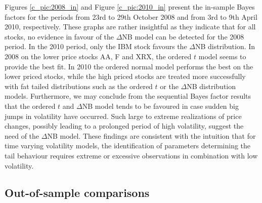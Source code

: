 \documentclass[12pt]{article}
\begin{document}
Figures \ref{c_pic:2008_in} and Figure \ref{c_pic:2010_in} present the in-sample
Bayes factors for the periods from 23rd to 29th October 2008 and from
3rd to 9th April 2010, respectively.
These graphs are rather insightful as they indicate that for all stocks, no evidence in
favour of the $\Delta$NB model can be detected for the 2008 period.
In the 2010 period, only the IBM stock favours the $\Delta$NB distribution.
In 2008 on the lower price stocks  AA, F and XRX,  the ordered $t$ model seems to
provide the best fit.
In 2010 the ordered normal model performs the best on the lower priced stocks,
while the high priced stocks are treated more successfully with fat tailed distributions
such as the ordered $t$ or the $\Delta$NB distribution models.
Furthermore, we may conclude from 
the sequential Bayes factor results that the ordered $t$ and $\Delta$NB model tends
to be favoured in case sudden big jumps in volatility have occurred.
Such large to extreme realizations of price changes, possibly leading to
a prolonged period of high volatility, suggest the need of the $\Delta$NB model.
These findings are consistent with the intuition that for time varying volatility
models, the identification of parameters determining the tail behaviour
requires extreme or excessive observations in combination with low volatility.




\subsection{Out-of-sample comparisons}
\end{document}
